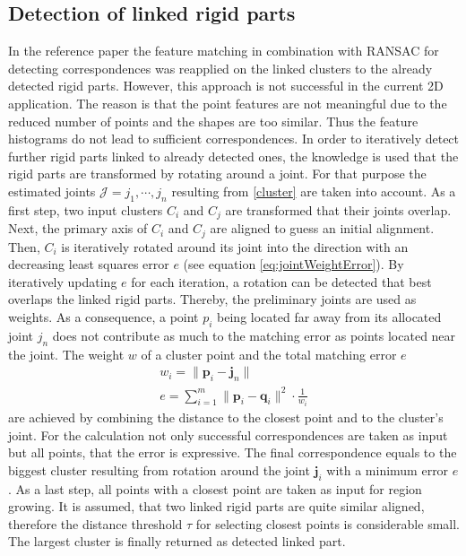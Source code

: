 \subsection{Detection of linked rigid parts}
\label{JointWeights}
In the reference paper the feature matching in combination with RANSAC for detecting correspondences was reapplied on the linked clusters to the already detected rigid parts. However, this approach is not successful in the current 2D application. The reason is that the point features are not meaningful due to the reduced number of points and the shapes are too similar. Thus the feature histograms do not lead to sufficient correspondences. In order to iteratively detect further rigid parts linked to already detected ones, the knowledge is used that the rigid parts are transformed by rotating around a joint. For that purpose the estimated joints $\mathcal{J} = j_1,\cdots,j_n$ resulting from \ref{cluster} are taken into account. As a first step, two input clusters $C_i$ and $C_j$ are transformed that their joints overlap.  Next, the primary axis of $C_i$ and $C_j$ are aligned to guess an initial alignment. Then, $C_i$ is iteratively rotated around its joint  into the direction with an decreasing least squares error $e$ (see equation \ref{eq:jointWeightError}). By iteratively updating $e$ for each iteration, a rotation can be detected that best overlaps the linked rigid parts. Thereby, the preliminary joints are used as weights. As a consequence, a point $p_i$ being located far away from its allocated joint $j_n$ does not contribute as much to the matching error as points located near the joint. The weight $w$ of a cluster point and the total matching error $e$
%
\begin{equation}
\begin{split}
w_i = \| \boldsymbol{p}_i - \boldsymbol{j}_n\|
\\
e = \displaystyle\sum_{i=1}^{m}\| \boldsymbol{p}_i - \boldsymbol{q}_i\|^2 \cdot \frac{1}{w_i}
\end{split}
\label{eq:jointWeightError}
\end{equation}
%
are achieved by combining the distance to the closest point and to the cluster's joint. For the calculation not only successful correspondences are taken as input but all points, that the error is expressive. The final correspondence equals to the biggest cluster resulting from rotation around the joint $\boldsymbol{j}_i$ with a minimum error $e$. As a last step, all points with a closest point are taken as input for region growing. It is assumed, that two linked rigid parts are quite similar aligned, therefore the distance threshold $\tau$ for selecting closest points is considerable small. The largest cluster is finally returned as detected linked part.
